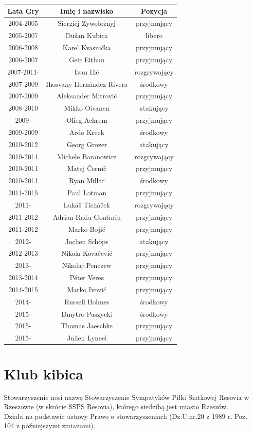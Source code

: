 \documentclass{article}
\begin{document}
\begin{tabular}{|c|c|c|} \hline
Lata Gry	&Imię i nazwisko	&Pozycja\\ \hline
2004-2005	&Siergiej Żywołożnyj	&przyjmujący\\ \hline
2005-2007	&Dušan Kubica	&libero\\ \hline
2006-2008	&Karel Kvasnička	&przyjmujący\\ \hline
2006-2007	&Geir Eithun	&przyjmujący\\ \hline
2007-2011-	&Ivan Ilić	&rozgrywający\\ \hline
2007-2009	&Ihosvany Hernández Rivera	&środkowy\\ \hline
2007-2009	&Aleksander Mitrović	&przyjmujący\\ \hline
2008-2010	& Mikko Oivanen	&atakujący\\ \hline
2009-	&Olieg Achrem	&przyjmujący\\ \hline
2009-2009	& Ardo Kreek	&środkowy\\ \hline
2010-2012	& Georg Grozer	&atakujący\\ \hline
2010-2011	& Michele Baranowicz	&rozgrywający\\ \hline
2010-2011	& Matej Černič	&przyjmujący\\ \hline
2010-2011	&Ryan Millar	&środkowy\\ \hline
2011-2015	&Paul Lotman	&przyjmujący\\ \hline
2011-	& Lukáš Ticháček	&rozgrywający\\ \hline
2011-2012	& Adrian Radu Gontariu	&przyjmujący\\ \hline
2011-2012	& Marko Bojić	&przyjmujący\\ \hline
2012-	& Jochen Schöps	&atakujący\\ \hline
2012-2013	& Nikola Kovačević	&przyjmujący\\ \hline
2013-	& Nikołaj Penczew	&przyjmujący\\ \hline
2013-2014	& Péter Veres	&przyjmujący\\ \hline
2014-2015	&Marko Ivović	&przyjmujący\\ \hline
2014-	&Russell Holmes	&środkowy\\ \hline
2015-	&Dmytro Paszycki	&środkowy\\ \hline
2015-	&Thomas Jaeschke	&przyjmujący\\ \hline
2015-	&Julien Lyneel	&przyjmujący\\ \hline
\end{tabular}
\section{Klub kibica}
Stowarzyszenie nosi nazwę Stowarzyszenie Sympatyków Piłki Siatkowej Resovia w Rzeszowie (w skrócie SSPS Resovia), którego siedzibą jest miasto Rzeszów. Działa na podstawie ustawy Prawo o stowarzyszeniach (Dz.U.nr.20 z 1989 r. Poz. 104 z późniejszymi zmianami).
\end{document}
